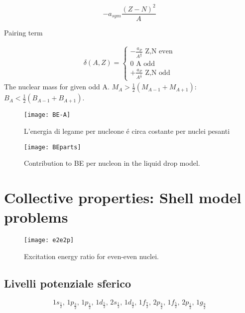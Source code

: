 \begin{enumerate*}
\begin{equation*}
-a_{sym}\frac{(Z-N)^2}{A}
\end{equation*}

\item Pairing term

\begin{align*}
\delta(A,Z)=\left\{\begin{array}{l}-\frac{a_P}{A^{\frac{1}{2}}} \text{ Z,N even}\\0 \text{ A odd}\\+\frac{a_P}{A^{\frac{1}{2}}} \text{ Z,N odd}\end{array}\right.
\end{align*}
The nuclear mass for given odd A.
$M_A>\frac{1}{2}(M_{A-1}+M_{A+1})$:
$B_A<\frac{1}{2}(B_{A-1}+B_{A+1})$.
\end{enumerate*}

\begin{figure}[!ht]
\centering
\texttt{[image: BE-A]}
\caption{L'energia di legame per nucleone \'e circa costante per nuclei pesanti}
\end{figure}

\begin{figure}[!ht]
\centering
\texttt{[image: BEparts]}
\caption{Contribution to BE per nucleon in the liquid drop model.}
\end{figure}

\section{Collective properties: Shell model problems}

\begin{figure}[!ht]
\centering
\texttt{[image: e2e2p]}
\caption{Excitation energy ratio for even-even nuclei.}
\end{figure}

\subsection{Livelli potenziale sferico}
\begin{equation*}
1s_{\frac{1}{2}},\,1p_{\frac{3}{2}},\,1p_{\frac{1}{2}},\,1d_{\frac{5}{2}},\,2s_{\frac{1}{2}},\,1d_{\frac{3}{2}},\,1f_{\frac{7}{2}},\,2p_{\frac{3}{2}},\,1f_{\frac{5}{2}},\,2p_{\frac{1}{2}},\,1g_{\frac{9}{2}}
\end{equation*}

